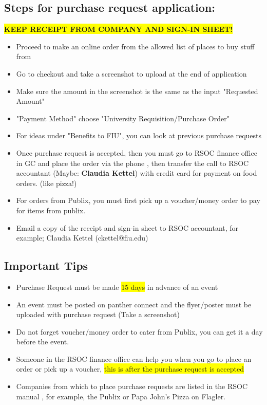 \documentclass{article}
\newcommand{\hlt}[1]{\colorbox{yellow}{#1}}
\begin{document}
\subsection{Steps for purchase request application:}
   \centering 
    \hlt{\textbf{KEEP RECEIPT FROM COMPANY AND SIGN-IN SHEET!}}
\begin{itemize}
    \item Proceed to make an online order from the allowed list of places to buy stuff from
    \item Go to checkout and take a screenshot to upload at the end of application
    \item Make sure the amount in the screenshot is the same as the input "Requested Amount"
    \item "Payment Method" choose "University Requisition/Purchase Order"
    \item For ideas under "Benefits to FIU", you can look at previous purchase requests
    \item Once purchase request is accepted, then you must go to RSOC finance office in GC and place the order via the phone , then transfer the call to RSOC accountant (Maybe: \textbf{Claudia Kettel}) with credit card for payment on food orders. (like pizza!)
    \item For orders from Publix, you must first pick up a voucher/money order to pay for items from publix.
    \item Email a copy of the receipt and sign-in sheet to RSOC accountant, for example; Claudia Kettel (ckettel@fiu.edu)
\end{itemize}

\subsection{Important Tips}
\begin{itemize}
    \item Purchase Request must be made \hlt{15 days} in advance of an event
    \item An event must be posted on panther connect and the flyer/poster must be uploaded with purchase request (Take a screenshot)
    \item Do not forget voucher/money order to cater from Publix, you can get it a day before the event.
    \item Someone in the RSOC finance office can help you when you go to place an order or pick up a voucher, \hlt{this is after the purchase request is accepted}
    \item Companies from which to place purchase requests are listed in the RSOC manual \cite{rsocManual}, for example, the Publix or Papa John’s Pizza on Flagler.
\end{itemize}
\newpage
\end{document}
